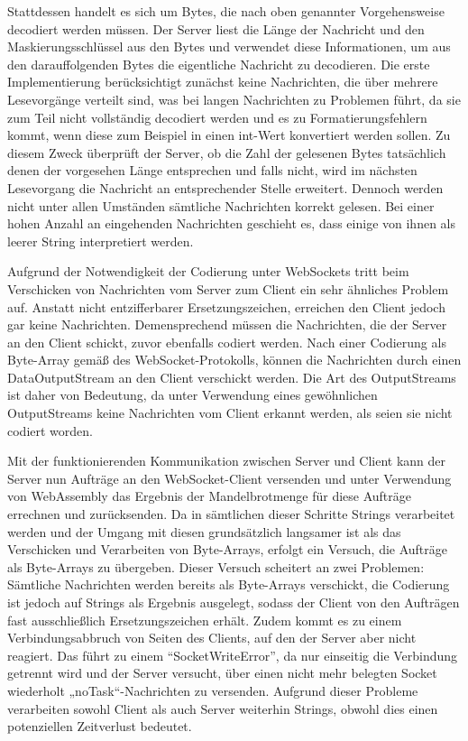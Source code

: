 \documentclass[12pt, onecolumn, notitlepage]{scrartcl}
\begin{document}
Stattdessen handelt es sich um Bytes, die nach oben genannter Vorgehensweise decodiert werden müssen. Der Server liest die Länge der Nachricht und den Maskierungsschlüssel aus den Bytes und verwendet diese Informationen, um aus den darauffolgenden Bytes die eigentliche Nachricht zu decodieren. Die erste Implementierung berücksichtigt zunächst keine Nachrichten, die über mehrere Lesevorgänge verteilt sind, was bei langen Nachrichten zu Problemen führt, da sie zum Teil nicht vollständig decodiert werden und es zu Formatierungsfehlern kommt, wenn diese zum Beispiel in einen int-Wert konvertiert werden sollen. Zu diesem Zweck überprüft der Server, ob die Zahl der gelesenen Bytes tatsächlich denen der vorgesehen Länge entsprechen und falls nicht, wird im nächsten Lesevorgang die Nachricht an entsprechender Stelle erweitert. Dennoch werden nicht unter allen Umständen sämtliche Nachrichten korrekt gelesen. Bei einer hohen Anzahl an eingehenden Nachrichten geschieht es, dass einige von ihnen als leerer String interpretiert werden. \par

Aufgrund der Notwendigkeit der Codierung unter WebSockets tritt beim Verschicken von Nachrichten vom Server zum Client ein sehr ähnliches Problem auf. Anstatt nicht entzifferbarer Ersetzungszeichen, erreichen den Client jedoch gar keine Nachrichten. Demensprechend müssen die Nachrichten, die der Server an den Client schickt, zuvor ebenfalls codiert werden. Nach einer Codierung als Byte-Array gemäß des WebSocket-Protokolls, können die Nachrichten durch einen DataOutputStream an den Client verschickt werden. Die Art des OutputStreams ist daher von Bedeutung, da unter Verwendung eines gewöhnlichen OutputStreams keine Nachrichten vom Client erkannt werden, als seien sie nicht codiert worden. \par

Mit der funktionierenden Kommunikation zwischen Server und Client kann der Server nun Aufträge an den WebSocket-Client versenden und unter Verwendung von WebAssembly das Ergebnis der Mandelbrotmenge für diese Aufträge errechnen und zurücksenden. Da in sämtlichen dieser Schritte Strings verarbeitet werden und der Umgang mit diesen grundsätzlich langsamer ist als das Verschicken und Verarbeiten von Byte-Arrays, erfolgt ein Versuch, die Aufträge als Byte-Arrays zu übergeben. Dieser Versuch scheitert an zwei Problemen: Sämtliche Nachrichten werden bereits als Byte-Arrays verschickt, die Codierung ist jedoch auf Strings als Ergebnis ausgelegt, sodass der Client von den Aufträgen fast ausschließlich Ersetzungszeichen erhält. Zudem kommt es zu einem Verbindungsabbruch von Seiten des Clients, auf den der Server aber nicht reagiert. Das führt zu einem \enquote{SocketWriteError}, da nur einseitig die Verbindung getrennt wird und der Server versucht, über einen nicht mehr belegten Socket wiederholt „noTask“-Nachrichten zu versenden. Aufgrund dieser Probleme verarbeiten sowohl Client als auch Server weiterhin Strings, obwohl dies einen potenziellen Zeitverlust bedeutet. \par
\end{document}
